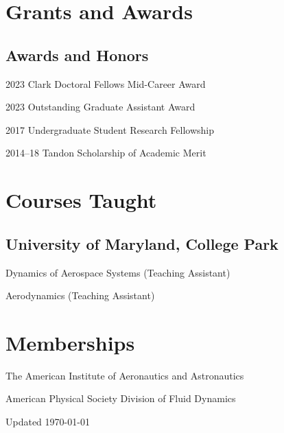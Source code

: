\documentclass[12pt,letterpaper]{report}
\newcommand{\listitemspace}{0.25em}
\renewenvironment{itemize}
{\begin{list}{}{\setlength{\leftmargin}{0em}
                \setlength{\parskip}{0em}
                \setlength{\itemsep}{\listitemspace}
                \setlength{\parsep}{\listitemspace}}}
{\end{list}}
\begin{document}
    \section*{Grants and Awards}

    \subsection*{Awards and Honors}

    \begin{tablist}
\item[2023] \tab{}Clark Doctoral Fellows Mid-Career Award 

\item[2023] \tab{}Outstanding Graduate Assistant Award


        \item[2017] \tab{}Undergraduate Student Research Fellowship
        \item[2014--18] \tab{}Tandon Scholarship of Academic Merit

    \end{tablist}





    \section*{Courses Taught}

    \subsection*{University of Maryland, College Park}
    
    \begin{itemize}

        \item Dynamics of Aerospace Systems (Teaching Assistant)
        \item Aerodynamics (Teaching Assistant)

    \end{itemize}

 
    \section*{Memberships}

    \begin{itemize}

        \item The American Institute of Aeronautics and Astronautics
        \item American Physical Society Division of Fluid Dynamics

    \end{itemize}



    \begin{center}
        \vfill
        Updated \monthyeardate\today
    \end{center}
\end{document}
